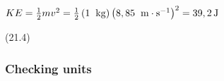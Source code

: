 {\begin{mdframed}[linewidth=4, leftmargin=40, rightmargin=40]
\begin{exercise}
\begin{enumerate}[noitemsep, label=\textbf{Step} \textbf{\arabic*}. ]
{\begin{minipage}{\columnwidth}
    \parbox[t]{\mymathboxwidth}{\large\begin{math}
    KE=\frac{1}{2}m{v}^{2}=\frac{1}{2}\left(1\phantom{\rule{4pt}{0ex}}\phantom{\rule{0.166667em}{0ex}}\mathrm{kg}\right){\left(8,85\phantom{\rule{4pt}{0ex}}\phantom{\rule{0.166667em}{0ex}}\mathrm{m}\ensuremath{\cdot}{\mathrm{s}}^{-1}\right)}^{2}=39,2\phantom{\rule{0.166667em}{0ex}}\mathrm{J}\end{math}}\hfill
    \parbox[t]{48pt}{\raggedleft 
    (21.4)}
    \end{minipage}\vspace{12pt}\par
    }%
    
      
      
      \end{enumerate}
         

    \end{exercise}
    \end{mdframed}
    }
    \noindent
  
      \label{m38785*uid65}
            \subsubsection{ Checking units}
            \nopagebreak
            
